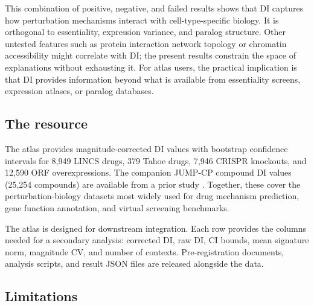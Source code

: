 \documentclass[11pt]{article}
\begin{document}
This combination of positive, negative, and failed results shows that DI
captures how perturbation mechanisms interact with
cell-type-specific biology.  It is orthogonal to essentiality,
expression variance, and paralog structure.  Other untested features
such as protein interaction network topology or chromatin accessibility
might correlate with DI; the present results constrain the space of
explanations without exhausting it.  For atlas users, the practical
implication is that DI provides information beyond what is available
from essentiality screens, expression atlases, or paralog databases.

\subsection{The resource}

The atlas provides magnitude-corrected DI values with bootstrap
confidence intervals for 8{,}949 LINCS drugs, 379 Tahoe drugs, 7{,}946
CRISPR knockouts, and 12{,}590 ORF overexpressions.  The companion JUMP-CP
compound DI values (25{,}254 compounds) are available from a prior
study \citep{tower2026confound}.  Together, these cover the
perturbation-biology datasets most widely used for drug mechanism
prediction, gene function annotation, and virtual screening
benchmarks.

The atlas is designed for downstream integration.  Each row provides the
columns needed for a secondary analysis: corrected DI, raw DI, CI
bounds, mean signature norm, magnitude CV, and number of contexts.
Pre-registration documents, analysis scripts, and result JSON files are
released alongside the data.

\subsection{Limitations}
\end{document}
